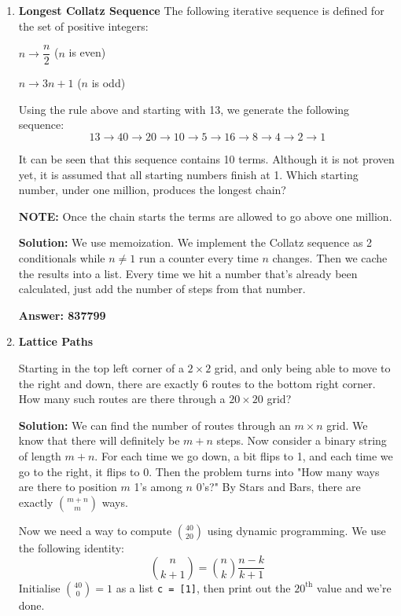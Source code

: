 \documentclass[12pt]{article}
\begin{document}
\begin{enumerate}
    \item \textbf{Longest Collatz Sequence}
    The following iterative sequence is defined for the set of positive integers: 
    \par $n \rightarrow \dfrac{n}{2}$ ($n$ is even)
    \par $n \rightarrow 3n+1$ ($n$ is odd)
    \par Using the rule above and starting with 13, we generate the following sequence: 
    $$ 13 \rightarrow 40 \rightarrow 20 \rightarrow 10 \rightarrow 5 \rightarrow 16 \rightarrow 8 \rightarrow 4 \rightarrow 2 \rightarrow 1$$
    \par It can be seen that this sequence contains 10 terms. Although it is not proven yet, it is assumed that all starting numbers finish at 1. Which starting number, under one million, produces the longest chain? \par \textbf{NOTE:} Once the chain starts the terms are allowed to go above one million.

    \par \textbf{Solution:} We use memoization. We implement the Collatz sequence as 2 conditionals while $n \neq 1$ run a counter every time $n$ changes. Then we cache the results into a list. Every time we hit a number that's already been calculated, just add the number of steps from that number.
    \par \textbf{Answer: 837799}

    \item \textbf{Lattice Paths}
    \par Starting in the top left corner of a $2 \times 2$ grid, and only being able to move to the right and down, there are exactly 6 routes to the bottom right corner. How many such routes are there through a $20 \times 20$ grid?

    \par \textbf{Solution:} We can find the number of routes through an $m \times n$ grid. We know that there will definitely be $m+n$ steps. Now consider a binary string of length $m+n$. For each time we go down, a bit flips to 1, and each time we go to the right, it flips to 0. Then the problem turns into "How many ways are there to position $m$ 1's among $n$ 0's?" By Stars and Bars, there are exactly $\binom{m+n}{m}$ ways.
    \par Now we need a way to compute $\binom{40}{20}$ using dynamic programming. We use the following identity:
    \begin{equation*}
        \binom{n}{k+1} = \binom{n}{k} \dfrac{n-k}{k+1}
    \end{equation*}
    Initialise $\binom{40}{0} = 1$ as a list \texttt{c = [1]}, then print out the $20^\text{th}$ value and we're done.


\end{enumerate}
\end{document}
